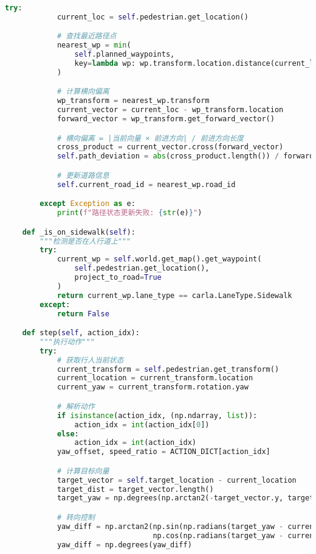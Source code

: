 \begin{lstlisting}[language=Python]
        try:
            current_loc = self.pedestrian.get_location()

            # 查找最近路径点
            nearest_wp = min(
                self.planned_waypoints,
                key=lambda wp: wp.transform.location.distance(current_loc)
            )

            # 计算横向偏离
            wp_transform = nearest_wp.transform
            current_vector = current_loc - wp_transform.location
            forward_vector = wp_transform.get_forward_vector()

            # 横向偏离 = |当前向量 × 前进方向| / 前进方向长度
            cross_product = current_vector.cross(forward_vector)
            self.path_deviation = abs(cross_product.length()) / forward_vector.length()

            # 更新道路信息
            self.current_road_id = nearest_wp.road_id

        except Exception as e:
            print(f"路径状态更新失败: {str(e)}")

    def _is_on_sidewalk(self):
        """检测是否在人行道上"""
        try:
            current_wp = self.world.get_map().get_waypoint(
                self.pedestrian.get_location(),
                project_to_road=True
            )
            return current_wp.lane_type == carla.LaneType.Sidewalk
        except:
            return False

    def step(self, action_idx):
        """执行动作"""
        try:
            # 获取行人当前状态
            current_transform = self.pedestrian.get_transform()
            current_location = current_transform.location
            current_yaw = current_transform.rotation.yaw

            # 解析动作
            if isinstance(action_idx, (np.ndarray, list)):
                action_idx = int(action_idx[0])
            else:
                action_idx = int(action_idx)
            yaw_offset, speed_ratio = ACTION_DICT[action_idx]

            # 计算目标向量
            target_vector = self.target_location - current_location
            target_dist = target_vector.length()
            target_yaw = np.degrees(np.arctan2(-target_vector.y, target_vector.x))

            # 转向控制
            yaw_diff = np.arctan2(np.sin(np.radians(target_yaw - current_yaw)),
                                  np.cos(np.radians(target_yaw - current_yaw)))
            yaw_diff = np.degrees(yaw_diff)


\end{lstlisting}
